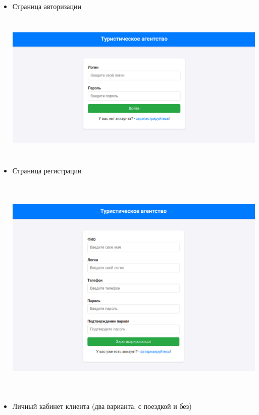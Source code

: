 \documentclass[a4paper,12pt]{article}
\begin{document}
\begin{itemize}
    \item Страница авторизации

          \includegraphics[width=6.260415573053368in, height=2.84375in]{media/login.png}

    \item Страница регистрации

          \includegraphics[width=6.260415573053368in, height=4.3125in]{media/reg.png}

    \item Личный кабинет клиента (два варианта, с поездкой и без)


\end{itemize}
\end{document}
